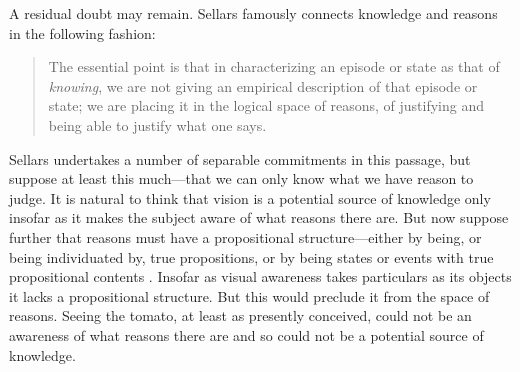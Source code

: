 \documentclass[12pt]{article}
\begin{document}
A residual doubt may remain. Sellars famously connects knowledge and reasons in the following fashion:
\begin{quote}
	The essential point is that in characterizing an episode or state as that of \emph{knowing}, we are not giving an empirical description of that episode or state; we are placing it in the logical space of reasons, of justifying and being able to justify what one says. \citep[§36]{Sellars:1956xp}
\end{quote}
Sellars undertakes a number of separable commitments in this passage, but suppose at least this much---that we can only know what we have reason to judge. It is natural to think that vision is a potential source of knowledge only insofar as it makes the subject aware of what reasons there are. But now suppose further that reasons must have a propositional structure---either by being, or being individuated by, true propositions, or by being states or events with true propositional contents \citep[see][141, 143--4]{McDowell:1996uq}. Insofar as visual awareness takes particulars as its objects it lacks a propositional structure. But this would preclude it from the space of reasons. Seeing the tomato, at least as presently conceived, could not be an awareness of what reasons there are and so could not be a potential source of knowledge.
\end{document}
